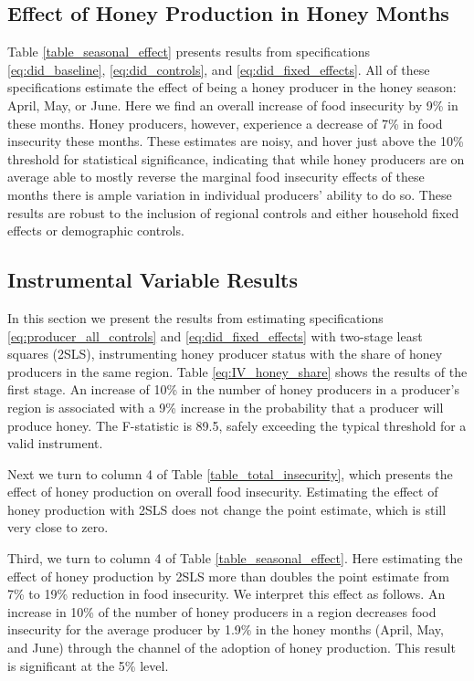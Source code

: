 \documentclass[../main.tex]{subfiles}
\begin{document}
\subsection{Effect of Honey Production in Honey Months}
Table \ref{table_seasonal_effect} presents results from specifications
\ref{eq:did_baseline}, \ref{eq:did_controls}, and \ref{eq:did_fixed_effects}.
All of these specifications estimate the effect of being a honey producer in  the honey season: April, May, or June. Here we find an overall increase of food insecurity by 9\% in these months. Honey producers, however, experience a decrease of 7\% in food insecurity these months. These estimates are noisy, and hover just above the   10\% threshold for statistical significance, indicating that while honey producers are on average able to mostly reverse the marginal food insecurity effects of these months there is ample variation in individual producers' ability to do so. 
These results are robust to the inclusion of regional controls
and either household fixed effects or demographic controls.

\subsection{Instrumental Variable Results}
In this section we present the results from estimating
specifications \ref{eq:producer_all_controls} and
\ref{eq:did_fixed_effects} with two-stage least squares (2SLS), instrumenting honey producer status with the share of honey producers in the same region.  Table \ref{eq:IV_honey_share} shows the results of the first stage. An increase of 10\%
in the number of honey producers in a producer's region is associated with a 9\% increase in the probability that a producer will produce honey. The F-statistic is 89.5, safely exceeding the typical threshold for a valid instrument. 

Next we turn to column 4 of Table \ref{table_total_insecurity},
which presents the effect of honey production on overall
food insecurity. Estimating the effect of honey production
with 2SLS does not change the point estimate, which is still very close to zero. 

Third, we turn to column 4 of Table \ref{table_seasonal_effect}. Here estimating the effect of honey production by 2SLS more than
doubles the point estimate from 7\% to 19\% reduction in food 
insecurity. We interpret this effect as follows.
An increase in 10\% of the number of honey producers in a region
decreases food insecurity for the average producer
by 1.9\% in the honey months (April, May, and June) through
the channel of the adoption of honey production. This result
is significant at the 5\% level. 
\end{document}
